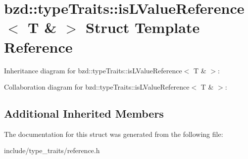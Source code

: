 \hypertarget{structbzd_1_1typeTraits_1_1isLValueReference_3_01T_01_6_01_4}{}\section{bzd\+:\+:type\+Traits\+:\+:is\+L\+Value\+Reference$<$ T \& $>$ Struct Template Reference}
\label{structbzd_1_1typeTraits_1_1isLValueReference_3_01T_01_6_01_4}


Inheritance diagram for bzd\+:\+:type\+Traits\+:\+:is\+L\+Value\+Reference$<$ T \& $>$\+:


Collaboration diagram for bzd\+:\+:type\+Traits\+:\+:is\+L\+Value\+Reference$<$ T \& $>$\+:
\subsection*{Additional Inherited Members}


The documentation for this struct was generated from the following file\+:\begin{DoxyCompactItemize}
\item 
include/type\+\_\+traits/reference.\+h\end{DoxyCompactItemize}

